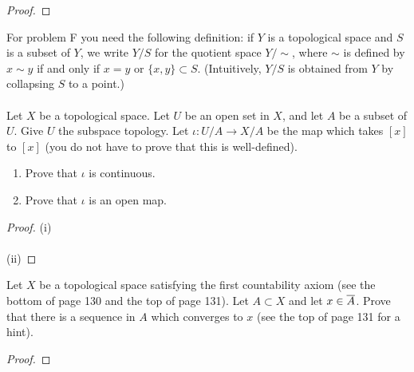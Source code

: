 \begin{proof}
\end{proof}
\newpage
\begin{problem}[F]
For problem F you need the following definition: if $Y$ is a
topological space and $S$ is a subset of $Y$, we write $Y/S$ for
the quotient space $Y/{\sim}$, where $\sim$ is defined by $x\sim y$
if and only if $x=y$ or $\{x,y\}\subset S$. (Intuitively, $Y/S$
is obtained from $Y$ by collapsing $S$ to a point.)
\\\\
Let $X$ be a topological space. Let $U$ be an open set in $X$,
and let $A$ be a subset of $U$. Give $U$ the subspace
topology. Let $\iota\colon U/A\to X/A$ be the map which takes
$[x]$ to $[x]$ (you do not have to prove that this is
well-defined).
\begin{enumerate}[noitemsep,label=(\roman*)]
\item Prove that $\iota$ is continuous.
\item Prove that $\iota$ is an open map.
\end{enumerate}
\end{problem}
\begin{proof}
(i)
\\\\
(ii)
\end{proof}
\newpage
\begin{problem}[G]
Let $X$ be a topological space satisfying the first countability
axiom (see the bottom of page 130 and the top of page 131). Let
$A\subset X$ and let $x\in\overline{A}$. Prove that there is a
sequence in $A$ which converges to $x$ (see the top of page 131
for a hint).
\end{problem}
\begin{proof}
\end{proof}


